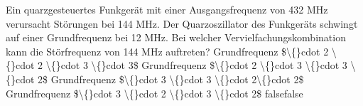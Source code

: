     {Ein quarzgesteuertes Funkgerät mit einer Ausgangsfrequenz von 432 MHz verursacht Störungen bei 144 MHz. Der Quarzoszillator des Funkgeräts schwingt auf einer Grundfrequenz bei 12 MHz.  Bei welcher Vervielfachungskombination kann die Störfrequenz von 144 MHz auftreten?  }
    {Grundfrequenz \$\textbackslash\{\}cdot 2 \textbackslash\{\}cdot 2 \textbackslash\{\}cdot 3 \textbackslash\{\}cdot 3\$}
    {Grundfrequenz \$\textbackslash\{\}cdot 2 \textbackslash\{\}cdot 3 \textbackslash\{\}cdot 3 \textbackslash\{\}cdot 2\$}
    {Grundfrequenz \$\textbackslash\{\}cdot 3 \textbackslash\{\}cdot 3 \textbackslash\{\}cdot 2\textbackslash\{\}cdot 2\$}
    {Grundfrequenz \$\textbackslash\{\}cdot 3 \textbackslash\{\}cdot 2 \textbackslash\{\}cdot 3 \textbackslash\{\}cdot 2\$}
    {false}{false}